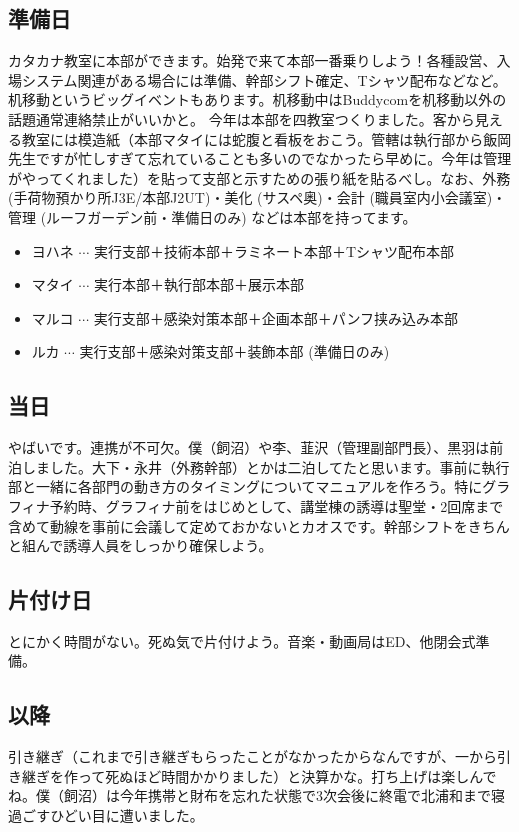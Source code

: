 \documentclass[dvipdfmx,jb5]{jreport}
\begin{document}
\subsection{準備日}
カタカナ教室に本部ができます。始発で来て本部一番乗りしよう！各種設営、入場システム関連がある場合には準備、幹部シフト確定、Tシャツ配布などなど。机移動というビッグイベントもあります。机移動中はBuddycomを机移動以外の話題通常連絡禁止がいいかと。
今年は本部を四教室つくりました。客から見える教室には模造紙（本部マタイには蛇腹と看板をおこう。管轄は執行部から飯岡先生ですが忙しすぎて忘れていることも多いのでなかったら早めに。今年は管理がやってくれました）を貼って支部と示すための張り紙を貼るべし。なお、外務 (手荷物預かり所J3E/本部J2UT)・美化 (サスペ奥)・会計 (職員室内小会議室)・管理 (ルーフガーデン前・準備日のみ) などは本部を持ってます。
\begin{itemize}
      \item ヨハネ $\cdots$ 実行支部＋技術本部＋ラミネート本部＋Tシャツ配布本部
      \item マタイ $\cdots$ 実行本部＋執行部本部＋展示本部
      \item マルコ $\cdots$ 実行支部＋感染対策本部＋企画本部＋パンフ挟み込み本部
      \item ルカ $\cdots$ 実行支部＋感染対策支部＋装飾本部 (準備日のみ)
\end{itemize}

\subsection{当日}
やばいです。連携が不可欠。僕（飼沼）や李、韮沢（管理副部門長）、黒羽は前泊しました。大下・永井（外務幹部）とかは二泊してたと思います。事前に執行部と一緒に各部門の動き方のタイミングについてマニュアルを作ろう。特にグラフィナ予約時、グラフィナ前をはじめとして、講堂棟の誘導は聖堂・2回席まで含めて動線を事前に会議して定めておかないとカオスです。幹部シフトをきちんと組んで誘導人員をしっかり確保しよう。

\subsection{片付け日}
とにかく時間がない。死ぬ気で片付けよう。音楽・動画局はED、他閉会式準備。

\subsection{以降}
引き継ぎ（これまで引き継ぎもらったことがなかったからなんですが、一から引き継ぎを作って死ぬほど時間かかりました）と決算かな。打ち上げは楽しんでね。僕（飼沼）は今年携帯と財布を忘れた状態で3次会後に終電で北浦和まで寝過ごすひどい目に遭いました。
\end{document}
